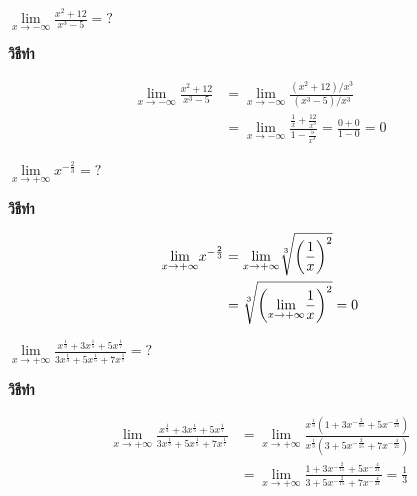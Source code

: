 \documentclass[
]{book}
\begin{document}
\label{ex-limit-7}
\(\underset{x\rightarrow -\infty }{\lim}\frac{x^{2}+12}{x^{3}-5}=?\)

\textbf{วิธีทำ}

\begin{equation}
  \begin{aligned}
    \underset{x\rightarrow -\infty }{\lim}\frac{x^{2}+12}{x^{3}-5}
        &=\underset{x\rightarrow -\infty }{\lim}\frac{\left( x^{2}+12\right) /x^{3}}{\left( x^{3}-5\right) /x^{3}} \\
        &=\underset{x\rightarrow -\infty }{\lim}\frac{\frac{1}{x}+\frac{12}{x^{3}}}{1-\frac{5}{x^{3}}}
    =\frac{0+0}{1-0}=0
  \end{aligned}
\end{equation}

\label{ex-limit-8}
\(\underset{x\rightarrow +\infty }{\lim}x^{-\frac{2}{3}}=?\)

\textbf{วิธีทำ}

\begin{equation}
  \begin{aligned}
    \underset{x\rightarrow +\infty }{\lim}x^{-\frac{2}{3}}
        &=\underset{x\rightarrow +\infty }{\lim}\root{3}\of{\left( \frac{1}{x}\right) ^{2}} \\
        &=\root{3}\of{\left( \underset{x\rightarrow +\infty }{\lim}\frac{1}{x}\right) ^{2}}
            =0
  \end{aligned}
\end{equation}

\label{ex-limit-9}
\(\underset{x\rightarrow +\infty }{\lim}\frac{x^{\frac{1}{3}}+3x^{\frac{1}{5}}+5x^{\frac{1}{7}}}{3x^{\frac{1}{3}}+5x^{\frac{1}{5}}+7x^{\frac{1}{7}}}=?\)

\textbf{วิธีทำ}

\begin{equation}
  \begin{aligned}
    \underset{x\rightarrow +\infty }{\lim}\frac{x^{\frac{1}{3}}+3x^{\frac{1}{5}}+5x^{\frac{1}{7}}}{3x^{\frac{1}{3}}+5x^{\frac{1}{5}}+7x^{\frac{1}{7}}}
        &=\underset{x\rightarrow +\infty }{\lim}\frac{x^{\frac{1}{3}}\left( 1+3x^{-\frac{2}{15}}+5x^{-\frac{4}{21}}\right) }{x^{\frac{1}{3}}\left( 3+5x^{-\frac{2}{15}}+7x^{-\frac{4}{21}}\right) } \\
        &=\underset{x\rightarrow +\infty }{\lim}\frac{1+3x^{-\frac{2}{15}}+5x^{-\frac{4}{21}}}{3+5x^{-\frac{2}{15}}+7x^{-\frac{4}{21}}}
=\frac{1}{3}
  \end{aligned}
\end{equation}
\end{document}
